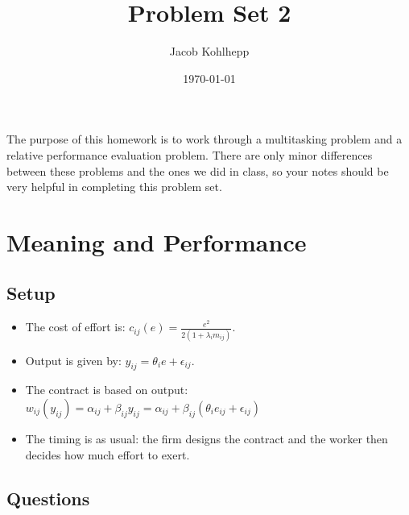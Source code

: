 \documentclass{article}
\title{Problem Set 2}
\author{Jacob Kohlhepp}
\date{\today}
\begin{document}
\maketitle


The purpose of this homework is to work through a multitasking problem and a relative performance evaluation problem. There are only minor differences between these problems and the ones we did in class, so your notes should be very helpful in completing this problem set.

\section{Meaning and Performance}
\subsection{Setup}
    \begin{itemize}
        \item The cost of effort is: $c_{ij}(e) = \frac{e^2}{2(1+\lambda_i m_{ij})} $.

    \item Output is given by: $y_{ij}=\theta_i e +\epsilon_{ij}$.
    \item The contract is based on output: $w_{ij}(y_{ij})= \alpha_{ij} + \beta_{ij} y_{ij}=\alpha_{ij} + \beta_{ij} (\theta_i e_{ij} +\epsilon_{ij})$
\item The timing is as usual: the firm designs the contract and the worker then decides how much effort to exert.

\end{itemize}

\subsection{Questions}
\end{document}
